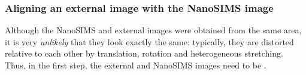 \subsubsection{Aligning an external image with the NanoSIMS image}
\setcounter{step}{0}

\goldbox{}
Although the NanoSIMS and external images were obtained from the same area, it is very \emph{unlikely} that they look exactly the same: typically, they are distorted relative to each other by translation, rotation and heterogeneous stretching. Thus, in the first step, the external and NanoSIMS images need to be .
\tcbe


